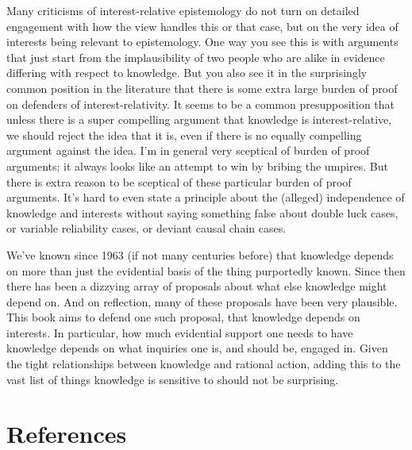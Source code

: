 \documentclass[
  12pt,
  letterpaper,
]{scrbook}
\begin{document}
Many criticisms of interest-relative epistemology do not turn on
detailed engagement with how the view handles this or that case, but on
the very idea of interests being relevant to epistemology. One way you
see this is with arguments that just start from the implausibility of
two people who are alike in evidence differing with respect to
knowledge. But you also see it in the surprisingly common position in
the literature that there is some extra large burden of proof on
defenders of interest-relativity. It seems to be a common presupposition
that unless there is a super compelling argument that knowledge is
interest-relative, we should reject the idea that it is, even if there
is no equally compelling argument against the idea. I'm in general very
sceptical of burden of proof arguments; it always looks like an attempt
to win by bribing the umpires. But there is extra reason to be sceptical
of these particular burden of proof arguments. It's hard to even state a
principle about the (alleged) independence of knowledge and interests
without saying something false about double luck cases, or variable
reliability cases, or deviant causal chain cases.

We've known since 1963 (if not many centuries before) that knowledge
depends on more than just the evidential basis of the thing purportedly
known. Since then there has been a dizzying array of proposals about
what else knowledge might depend on. And on reflection, many of these
proposals have been very plausible. This book aims to defend one such
proposal, that knowledge depends on interests. In particular, how much
evidential support one needs to have knowledge depends on what inquiries
one is, and should be, engaged in. Given the tight relationships between
knowledge and rational action, adding this to the vast list of things
knowledge is sensitive to should not be surprising.


\chapter*{References}\label{references}

\end{document}
